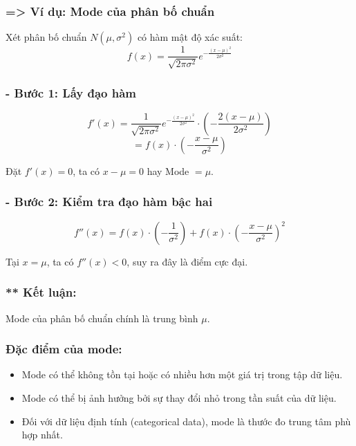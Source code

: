 \subsubsection*{=> Ví dụ: Mode của phân bố chuẩn}

Xét phân bố chuẩn $N(\mu, \sigma^2)$ có hàm mật độ xác suất:
\begin{equation}
    f(x) = \frac{1}{\sqrt{2\pi \sigma^2}} e^{-\frac{(x - \mu)^2}{2\sigma^2}}
\end{equation}

\subsubsection*{- Bước 1: Lấy đạo hàm}

\begin{equation}
    f'(x) = \frac{1}{\sqrt{2\pi \sigma^2}} e^{-\frac{(x - \mu)^2}{2\sigma^2}} \cdot \left( -\frac{2(x - \mu)}{2\sigma^2} \right)
\end{equation}
\begin{equation}
    = f(x) \cdot \left( -\frac{x - \mu}{\sigma^2} \right)
\end{equation}

Đặt $f'(x) = 0$, ta có $x - \mu = 0$ hay Mode $= \mu$.

\subsubsection*{- Bước 2: Kiểm tra đạo hàm bậc hai}

\begin{equation}
    f''(x) = f(x) \cdot \left( -\frac{1}{\sigma^2} \right) + f(x) \cdot \left( -\frac{x - \mu}{\sigma^2} \right)^2
\end{equation}

Tại $x = \mu$, ta có $f''(x) < 0$, suy ra đây là điểm cực đại.

\subsubsection*{** Kết luận: } Mode của phân bố chuẩn chính là trung bình $\mu$.



\subsubsection*{Đặc điểm của mode: }
\begin{itemize}
    \item Mode có thể không tồn tại hoặc có nhiều hơn một giá trị trong tập dữ liệu.
    \item Mode có thể bị ảnh hưởng bởi sự thay đổi nhỏ trong tần suất của dữ liệu.
    \item Đối với dữ liệu định tính (categorical data), mode là thước đo trung tâm phù hợp nhất.
\end{itemize}

